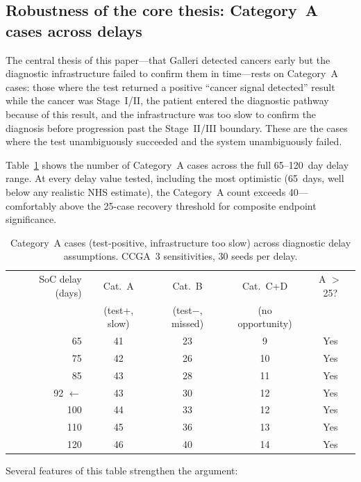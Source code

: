 \documentclass[11pt,letter]{article}
\begin{document}
\subsection{Robustness of the core thesis: Category~A cases across delays}
\label{sec:catA_robust}

The central thesis of this paper---that Galleri detected cancers early but
the diagnostic infrastructure failed to confirm them in time---rests on
Category~A cases: those where the test returned a positive ``cancer signal
detected'' result while the cancer was Stage~I/II, the patient entered the
diagnostic pathway because of this result, and the infrastructure was too
slow to confirm the diagnosis before progression past the Stage~II/III
boundary. These are the cases where the test unambiguously succeeded and
the system unambiguously failed.

Table~\ref{tab:catA_delay} shows the number of Category~A cases across the
full 65--120~day delay range. At every delay value tested, including the
most optimistic (65~days, well below any realistic NHS estimate), the
Category~A count exceeds 40---comfortably above the 25-case recovery
threshold for composite endpoint significance.

\begin{table}[!ht]\centering
\caption{Category~A cases (test-positive, infrastructure too slow) across
diagnostic delay assumptions. CCGA~3 sensitivities, 30 seeds per delay.}
\label{tab:catA_delay}
\begin{tabular}{rcccc}\toprule
SoC delay (days) & Cat.~A & Cat.~B & Cat.~C+D & A $>$ 25? \\
                 & (test+, slow) & (test$-$, missed) & (no opportunity) & \\ \midrule
65  & 41 & 23 & 9  & Yes \\
75  & 42 & 26 & 10 & Yes \\
85  & 43 & 28 & 11 & Yes \\
92 $\leftarrow$ & 43 & 30 & 12 & Yes \\
100 & 44 & 33 & 12 & Yes \\
110 & 45 & 36 & 13 & Yes \\
120 & 46 & 40 & 14 & Yes \\
\bottomrule
\end{tabular}
\end{table}

\noindent Several features of this table strengthen the argument:
\end{document}
